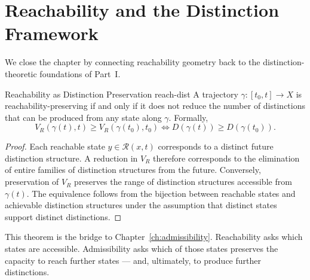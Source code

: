 \documentclass[12pt,twoside,openright]{book}
\newcommand{\reach}{\mathcal{R}}
\begin{document}
\section{Reachability and the Distinction Framework}
\label{sec:ch13-connection}

We close the chapter by connecting reachability geometry
back to the distinction-theoretic foundations of Part~I.

\begin{theorem}{Reachability as Distinction Preservation}%
  {reach-dist}
  A trajectory $\gamma:[t_0,t]\to X$ is
  reachability-preserving if and only if it does not reduce
  the number of distinctions that can be produced from any
  state along $\gamma$. Formally,
  \[
    V_R(\gamma(t),t) \ge V_R(\gamma(t_0),t_0)
    \iff
    D(\gamma(t)) \ge D(\gamma(t_0)).
  \]
\end{theorem}

\begin{proof}
  Each reachable state $y\in\reach(x,t)$ corresponds to a
  distinct future distinction structure. A reduction in
  $V_R$ therefore corresponds to the elimination of entire
  families of distinction structures from the future.
  Conversely, preservation of $V_R$ preserves the range of
  distinction structures accessible from $\gamma(t)$. The
  equivalence follows from the bijection between reachable
  states and achievable distinction structures under the
  assumption that distinct states support distinct
  distinctions.
\end{proof}

This theorem is the bridge to Chapter~\ref{ch:admissibility}.
Reachability asks which states are accessible.
Admissibility asks which of those states preserves the
capacity to reach further states --- and, ultimately, to
produce further distinctions.
\end{document}
